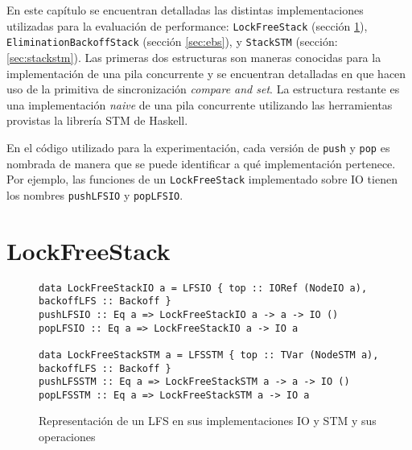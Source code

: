 En este capítulo se encuentran detalladas las distintas implementaciones utilizadas para la evaluación de performance: \texttt{LockFreeStack} (sección \ref{sec:lfs}), \texttt{EliminationBackoffStack} (sección \ref{sec:ebs}), y \texttt{StackSTM} (sección: \ref{sec:stackstm}). Las primeras dos estructuras son maneras conocidas para la implementación de una pila concurrente y se encuentran detalladas en \cite{shavit} que hacen uso de la primitiva de sincronización \emph{compare and set}. La estructura restante es una implementación \emph{naive} de una pila concurrente utilizando las herramientas provistas la librería STM de Haskell.

En el código utilizado para la experimentación, cada versión de \texttt{push} y \texttt{pop} es nombrada de manera que se puede identificar a qué implementación pertenece. Por ejemplo, las funciones de un \texttt{LockFreeStack} implementado sobre IO tienen los nombres \texttt{pushLFSIO} y \texttt{popLFSIO}.

\section{LockFreeStack}\label{sec:lfs}
\begin{figure}[t]
  \centering
  \begin{verbatim}
data LockFreeStackIO a = LFSIO { top :: IORef (NodeIO a), backoffLFS :: Backoff }
pushLFSIO :: Eq a => LockFreeStackIO a -> a -> IO ()
popLFSIO :: Eq a => LockFreeStackIO a -> IO a

data LockFreeStackSTM a = LFSSTM { top :: TVar (NodeSTM a), backoffLFS :: Backoff }
pushLFSSTM :: Eq a => LockFreeStackSTM a -> a -> IO ()
popLFSSTM :: Eq a => LockFreeStackSTM a -> IO a
  \end{verbatim}
  \caption{Representación de un LFS en sus implementaciones IO y STM y sus operaciones}
  \label{repLFS}
\end{figure}

